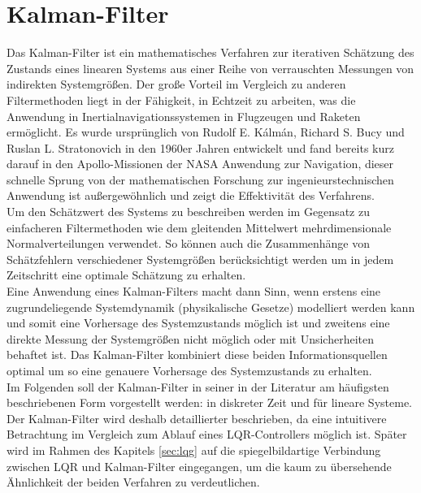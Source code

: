\section{Kalman-Filter}
\label{sec:kalman_filter}
Das Kalman-Filter ist ein mathematisches Verfahren zur iterativen Schätzung des Zustands eines linearen Systems aus einer Reihe von verrauschten Messungen von indirekten Systemgrößen. Der große Vorteil im Vergleich zu anderen Filtermethoden liegt in der Fähigkeit, in Echtzeit zu arbeiten, was die Anwendung in Inertialnavigationssystemen in Flugzeugen und Raketen ermöglicht.
Es wurde ursprünglich von Rudolf E. Kálmán, Richard S. Bucy und Ruslan L. Stratonovich in den 1960er Jahren entwickelt und fand bereits kurz darauf in den Apollo-Missionen der NASA Anwendung zur Navigation, dieser schnelle Sprung von der mathematischen Forschung zur ingenieurstechnischen Anwendung ist außergewöhnlich und zeigt die Effektivität des Verfahrens.
\\
Um den Schätzwert des Systems zu beschreiben werden im Gegensatz zu einfacheren Filtermethoden wie dem gleitenden Mittelwert mehrdimensionale Normalverteilungen verwendet. So können auch die Zusammenhänge von Schätzfehlern verschiedener Systemgrößen berücksichtigt werden um in jedem Zeitschritt eine optimale Schätzung zu erhalten.
\\
Eine Anwendung eines Kalman-Filters macht dann Sinn, wenn erstens eine zugrundeliegende Systemdynamik (physikalische Gesetze) modelliert werden kann und somit eine Vorhersage des Systemzustands möglich ist und zweitens eine direkte Messung der Systemgrößen nicht möglich oder mit Unsicherheiten behaftet ist. Das Kalman-Filter kombiniert diese beiden Informationsquellen optimal um so eine genauere Vorhersage des Systemzustands zu erhalten.
\\
Im Folgenden soll der Kalman-Filter in seiner in der Literatur am häufigsten beschriebenen Form vorgestellt werden: in diskreter Zeit und für lineare Systeme. Der Kalman-Filter wird deshalb detaillierter beschrieben, da eine intuitivere Betrachtung im Vergleich zum Ablauf eines LQR-Controllers möglich ist. Später wird im Rahmen des Kapitels \ref{sec:lqg} auf die spiegelbildartige Verbindung zwischen LQR und Kalman-Filter eingegangen, um die kaum zu übersehende Ähnlichkeit der beiden Verfahren zu verdeutlichen. 
\parencite{Kalman60}
\parencite{DorFuchsKalman}
\parencite{WikipediaKalman}

